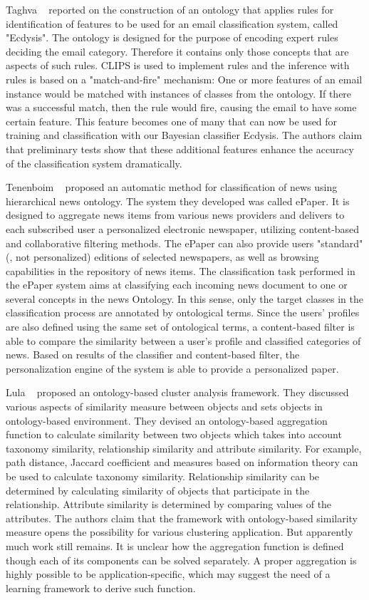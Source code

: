 Taghva \etal~\cite{Taghva2003Ont} reported on the construction of an ontology that applies rules for identification of features to be used for an email classification system, called "Ecdysis". The ontology is designed for the purpose of encoding expert rules deciding the email category. Therefore it contains only those concepts that are aspects of such rules. CLIPS is used to implement rules and the inference with rules is based on a "match-and-fire" mechanism: One or more features of an email instance would be matched with instances of classes from the ontology. If there was a successful match, then the rule would fire, causing the email to have some certain feature. This feature becomes one of many that can now be used for training and classification with our Bayesian classifier Ecdysis. The authors claim that preliminary tests show that these additional features enhance the accuracy of the classification system dramatically.

Tenenboim \etal~\cite{Tenenboim2008} proposed an automatic method for classification of news using hierarchical news ontology. The system they developed was called ePaper. It is designed to aggregate news items from various news providers and delivers to each subscribed user a personalized electronic newspaper, utilizing content-based and collaborative filtering methods. The ePaper can also provide users "standard" (\ie, not personalized) editions of selected newspapers, as well as browsing capabilities in the repository of news items. The classification task performed in the ePaper system aims at classifying each incoming news document to one or several concepts in the news Ontology. In this sense, only the target classes in the classification process are annotated by ontological terms. Since the users' profiles are also defined using the same set of ontological terms, a content-based filter is able to compare the similarity between a user's profile and classified categories of news. Based on results of the classifier and content-based filter, the personalization engine of the system is able to provide a personalized paper.

Lula \etal~\cite{Lula2008} proposed an ontology-based cluster analysis framework. They discussed various aspects of similarity measure between objects and sets objects in ontology-based environment.  They devised an ontology-based aggregation function to calculate similarity between two objects which takes into account taxonomy similarity, relationship similarity and attribute similarity. For example, path distance, Jaccard coefficient and measures based on information theory can be used to calculate taxonomy similarity. Relationship similarity can be determined by calculating similarity of objects that participate in the relationship. Attribute similarity is determined by comparing values of the attributes. The authors claim that the framework with ontology-based similarity measure opens the possibility for various clustering application. But apparently much work still remains. It is unclear how the aggregation function is defined though each of its components can be solved separately. A proper aggregation is highly possible to be application-specific, which may suggest the need of a learning framework to derive such function.

